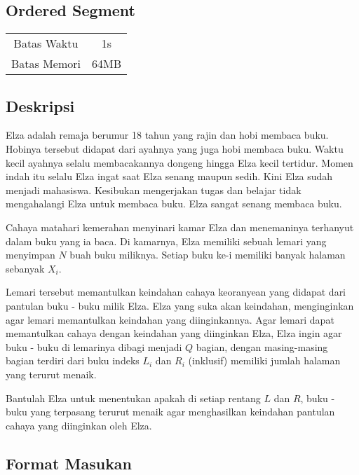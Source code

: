 \documentclass{article}
\begin{document}
\begin{center}
    \section*{Ordered Segment} %

    \begin{tabular}{ | c c | }
        \hline
        Batas Waktu  & 1s \\    %
        Batas Memori & 64MB \\  %
        \hline
    \end{tabular}
\end{center}

\subsection*{Deskripsi}

Elza adalah remaja berumur 18 tahun yang rajin dan hobi membaca buku.
Hobinya tersebut didapat dari ayahnya yang juga hobi membaca buku.
Waktu kecil ayahnya selalu membacakannya dongeng hingga Elza kecil tertidur.
Momen indah itu selalu Elza ingat saat Elza senang maupun sedih.
Kini Elza sudah menjadi mahasiswa.
Kesibukan mengerjakan tugas dan belajar tidak mengahalangi Elza untuk membaca buku.
Elza sangat senang membaca buku.

Cahaya matahari kemerahan menyinari kamar Elza dan menemaninya terhanyut dalam buku yang ia baca.
Di kamarnya, Elza memiliki sebuah lemari yang menyimpan $N$ buah buku miliknya. Setiap buku ke-i 
memiliki banyak halaman sebanyak $X_i$.

Lemari tersebut memantulkan keindahan cahaya keoranyean yang didapat dari pantulan buku - buku milik Elza.
Elza yang suka akan keindahan, menginginkan agar lemari memantulkan keindahan yang diinginkannya.
Agar lemari dapat memantulkan cahaya dengan keindahan yang diinginkan Elza,
Elza ingin agar buku - buku di lemarinya dibagi menjadi $Q$ bagian, dengan masing-masing bagian terdiri dari buku indeks
$L_i$ dan $R_i$ (inklusif) memiliki jumlah halaman yang terurut menaik.

Bantulah Elza untuk menentukan apakah di setiap rentang $L$ dan $R$, buku - buku yang terpasang terurut menaik agar menghasilkan keindahan pantulan cahaya yang diinginkan oleh Elza.

\subsection*{Format Masukan}
\end{document}
